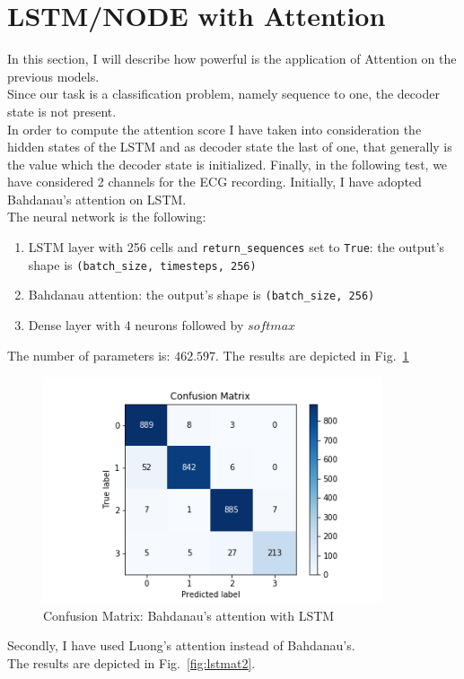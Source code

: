 \documentclass[LaM,binding=0.6cm]{sapthesis}
\begin{document}
\section{LSTM/NODE with Attention}
In this section, I will describe how powerful is the application of Attention on the previous models.\\Since our task is a classification problem, namely sequence to one, the decoder state is not present.\\In order to compute the attention score I have taken into consideration the hidden states of the LSTM and as decoder state the last of one, that generally is the value which the decoder state is initialized. Finally, in the following test, we have considered 2 channels for the ECG recording.
Initially, I have adopted Bahdanau's attention on LSTM.\\The neural network is the following:
\begin{enumerate}
\item LSTM layer with 256 cells and \texttt{return\_sequences} set to \texttt{True}: the output's shape is \texttt{(batch\_size, timesteps, 256)} 
\item Bahdanau attention: the output's shape is \texttt{(batch\_size, 256)} 
\item Dense layer with 4 neurons followed by $softmax$
\end{enumerate}
The number of parameters is: $462.597$.
The results are depicted in Fig.~\ref{fig:lstmat1}
\begin{figure}[H]  \centering
	\includegraphics[width=100mm,scale=0.7]{lstmat1}
	\caption{Confusion Matrix: Bahdanau's attention with LSTM}
	\label{fig:lstmat1}
\end{figure}
Secondly, I have used Luong's attention instead of Bahdanau's.\\The results are depicted in Fig.~\ref{fig:lstmat2}.
\end{document}
